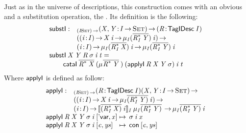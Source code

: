 Just as in the universe of descriptions, this construction comes with
an obvious \return and a substitution operation, the \bind. Its
definition is the following:
%
\[\stk{
\begin{array}{@{}ll}
\substI : & _{\PI{\V{I}}{\Set}}
            \PI{\V{X}, \V{Y}}{\V{I} \To \Set}
            \PITEL{\V{R}}{\TagIDesc{\V{I}}} \\
          & (\PI{\V{i}}{\V{I}} \V{X}\:\V{i} \To 
                               \IMu{\V{I}}{(\toIDesc{\FreeIMonad{\V{R}}{\V{I}}{\V{Y}}})}{\V{i}}) \To \\
          & \PI{\V{i}}{\V{I}}
            \IMu{\V{I}}{(\toIDesc{\FreeIMonad{\V{R}}{\V{I}}{\V{X}}})}{\V{i}} \To
            \IMu{\V{I}}{(\toIDesc{\FreeIMonad{\V{R}}{\V{I}}{\V{Y}}})}{\V{i}}
\end{array} \\
\substI\: \V{X}\: \V{Y}\: \V{R}\: \V{\sigma}\: \V{i}\: \V{t} = \\
\qquad    \cataI\: \toIDesc{\FreeIMonad{\V{R}}{}{\V{X}}}\:
                      (\IMu{}{\toIDesc{\FreeIMonad{\V{R}}{}{\V{Y}}}})\:
                      (\F{applyI}\: \V{R}\: \V{X}\: \V{Y}\: \V{\sigma})\:
                      \V{i}\:
                      \V{t} 
}\]
% 
Where  $\F{applyI}$ is defined as follow:
%
\[\stk{
\begin{array}{@{}ll}
\F{applyI} : & _{\PI{\V{I}}{\Set}}
            \PITEL{\V{R}}{\TagIDesc{\V{I}}}
            \PI{\V{X}, \V{Y}}{\V{I} \To \Set} \\
          & (\PI{\V{i}}{\V{I}} \V{X}\: \V{i} \To \IMu{\V{I}}{\toIDesc{(\FreeIMonad{\V{R}}{\V{I}}{\V{Y}})}}{\V{i}}) \To \\
          & \PI{\V{i}}{\V{I}} 
            \idescop{\toIDesc{(\FreeIMonad{\V{R}}
                                         {\V{I}}
                                         {\V{X}})}\: 
                     \V{i}}
                    {\V{I}}
{\IMu{\V{I}}{\toIDesc{(\FreeIMonad{\V{R}}{\V{I}}{\V{Y}})}}} \To 
           \IMu{\V{I}}{\toIDesc{(\FreeIMonad{\V{R}}{\V{I}}{\V{Y}})}}{\V{i}}
\end{array} \\
\begin{array}{@{}l@{\:\mapsto\:\:}l}
\F{applyI}\: \V{R}\: \V{X}\: \V{Y}\: \V{\sigma}\: \V{i}\: \pair{\SYMBDVar}{\V{x}}{}   & \V{\sigma}\: \V{i}\: \V{x}                   \\
\F{applyI}\: \V{R}\: \V{X}\: \V{Y}\: \V{\sigma}\: \V{i}\: \pair{\V{c}}{\V{ys}}{} & \Con{\pair{\V{c}}{\V{ys}}{}}
\end{array}
}\]
 
